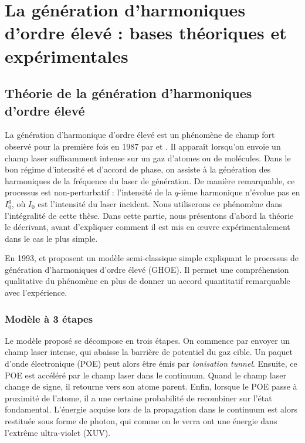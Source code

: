 \part{La génération d'harmoniques d'ordre élevé : bases théoriques et expérimentales}

\chapter{Théorie de la génération d'harmoniques d'ordre élevé}
La génération d'harmonique d'ordre élevé est un phénomène de champ fort observé pour la première fois en 1987 par  et . Il apparaît lorsqu'on envoie un champ laser suffisamment intense sur un gaz d'atomes ou de molécules. Dans le bon régime d'intensité et d'accord de phase, on assiste à la génération des harmoniques de la fréquence du laser de génération. De manière remarquable, ce processus est non-perturbatif : l'intensité de la $q$-ième harmonique n'évolue pas en $I_0^q$, où $I_0$ est l'intensité du laser incident. Nous utiliserons ce phénomène dans l'intégralité de cette thèse. Dans cette partie, nous présentons d'abord la théorie le décrivant, avant d'expliquer comment il est mis en œuvre expérimentalement dans le cas le plus simple.

En 1993,  et  proposent un modèle semi-classique simple expliquant le processus de génération d'harmoniques d'ordre élevé (GHOE). Il permet une compréhension qualitative du phénomène en plus de donner un accord quantitatif remarquable avec l'expérience.

\section{Modèle à 3 étapes}
\label{sec:threestep}
Le modèle proposé se décompose en trois étapes. On commence par envoyer un champ laser intense, qui abaisse la barrière de potentiel du gaz cible. Un paquet d'onde électronique (POE) peut alors être émis par \textit{ionisation tunnel}. Ensuite, ce POE est accéléré par le champ laser dans le continuum. Quand le champ laser change de signe, il retourne vers son atome parent. Enfin, lorsque le POE passe à proximité de l'atome, il a une certaine probabilité de recombiner sur l'état fondamental. L'énergie acquise lors de la propagation dans le continuum est alors restituée sous forme de photon, qui comme on le verra ont une énergie dans l'extrême ultra-violet (XUV).

